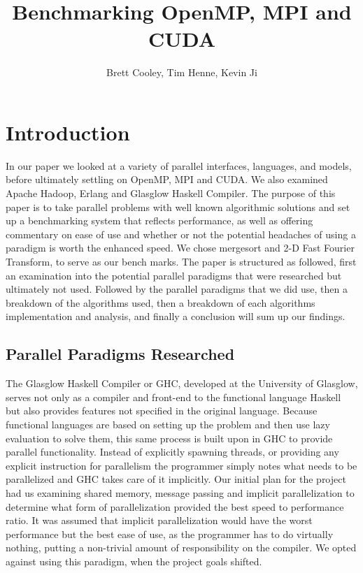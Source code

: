 \documentclass[conference,12pt]{IEEEtran}
\title{Benchmarking OpenMP, MPI and CUDA}
\author{Brett Cooley, Tim Henne, Kevin Ji}
\begin{document}
\maketitle
\section{Introduction}
	In our paper we looked at a variety of parallel interfaces, languages, and models, before ultimately settling on OpenMP, MPI and CUDA.  We also examined Apache Hadoop, Erlang and Glasglow Haskell Compiler.  
	The purpose of this paper is to take parallel problems with well known algorithmic solutions and set up a benchmarking system that reflects performance, as well as offering commentary on ease of use and whether or not the potential
	headaches of using a paradigm is worth the enhanced speed.  We chose mergesort and 2-D Fast Fourier Transform, to serve as our bench marks.  The paper is structured as followed, first an examination into the potential parallel paradigms that were
	researched but ultimately not used. Followed by the parallel paradigms that we did use, then a breakdown of the algorithms used, then a breakdown of each algorithms implementation and analysis, and finally a conclusion will sum up our findings.

	\subsection{Parallel Paradigms Researched}
		The Glasglow Haskell Compiler or GHC, developed at the University of Glasglow, serves not only as a compiler and front-end to the functional language Haskell but also provides features not specified in the original language.  Because functional languages
		are based on setting up the problem and then use lazy evaluation to solve them, this same process is built upon in GHC to provide parallel functionality.  Instead of explicitly spawning threads, or providing any explicit instruction for parallelism the 
		programmer simply notes what needs to be parallelized and GHC takes care of it implicitly.  Our initial plan for the project had us examining shared memory, message passing and implicit parallelization to determine what form of parallelization provided
		the best speed to performance ratio.  It was assumed that implicit parallelization would have the worst performance but the best ease of use, as the programmer has to do virtually nothing, putting a non-trivial amount of responsibility on the compiler.  
		We opted against using this paradigm, when the project goals shifted.
\end{document}
